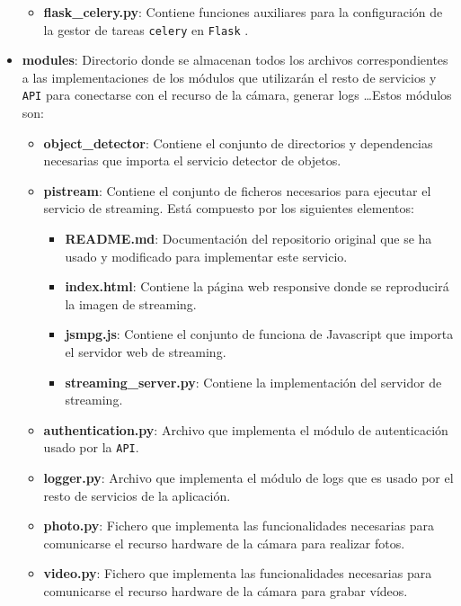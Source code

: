 \begin{itemize}
	\begin{itemize}
	\item \textbf{flask\_celery.py}: Contiene funciones auxiliares para la configuración de la gestor de tareas \texttt{celery} \cite{ref15} en \texttt{Flask} \cite{ref14}.
	\end{itemize}

\item \textbf{modules}: Directorio donde se almacenan todos los archivos correspondientes a las implementaciones de los módulos que utilizarán el resto de servicios y \texttt{API} para conectarse con el recurso de la cámara, generar logs \ldots Estos módulos son:

	\begin{itemize}
	\item \textbf{object\_detector}: Contiene el conjunto de directorios y dependencias necesarias que importa el servicio detector de objetos.
	\item \textbf{pistream}: Contiene el conjunto de ficheros necesarios para ejecutar el servicio de streaming. Está compuesto por los siguientes elementos:
		\begin{itemize}
		\item \textbf{README.md}: Documentación del repositorio original que se ha usado y modificado para implementar este servicio.
		\item \textbf{index.html}: Contiene la página web responsive donde se reproducirá la imagen de streaming.
		\item \textbf{jsmpg.js}: Contiene el conjunto de funciona de Javascript que importa el servidor web de streaming.
		\item \textbf{streaming\_server.py}: Contiene la implementación del servidor de streaming.
		\end{itemize}
		
		\item \textbf{authentication.py}: Archivo que implementa el módulo de autenticación usado por la \texttt{API}.
		\item \textbf{logger.py}: Archivo que implementa el módulo de logs que es usado por el resto de servicios de la aplicación.
		\item \textbf{photo.py}: Fichero que implementa las funcionalidades necesarias para comunicarse el recurso hardware de la cámara para realizar fotos.
		\item \textbf{video.py}: Fichero que implementa las funcionalidades necesarias para comunicarse el recurso hardware de la cámara para grabar vídeos.
				

\end{itemize}
\end{itemize}
